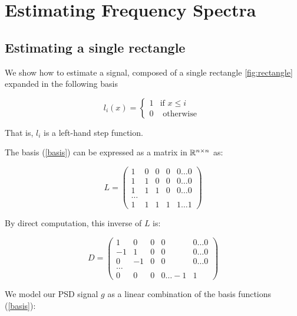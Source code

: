 \documentclass{article}
\begin{document}
\section{Estimating Frequency Spectra}\label{sec:freq-model}

\subsection{Estimating a single rectangle}

We show how to estimate a signal, composed of a single rectangle \eqref{fig:rectangle} expanded in the following basis

\begin{equation}
l_i\left(x\right) =
\begin{cases}
1 & \text{if } x \leq i \\
0 & \text{ otherwise } 
\end{cases}
\label{basis}
\end{equation}

That is, \(l_i\) is a left-hand step function. 

The basis (\ref{basis}) can be expressed as a matrix in \({\mathbb{R}}^{n \times n}\) as:

\begin{equation}
L = \begin{pmatrix}
 1 & 0 & 0 & 0  & 0 \ldots 0 \\
  1 & 1 & 0 & 0  & 0 \ldots 0\\
     1 & 1 & 1 & 0  & 0 \ldots0  \\
    \ldots  \\
     1 & 1 & 1 & 1  & 1 \ldots 1 
\end{pmatrix}
\label{lower-L}
\end{equation}

By direct computation, this inverse of \(L\) is:

\begin{equation}
D = \begin{pmatrix}
 1 & 0 & 0 & 0  & 0 \ldots 0 \\
  -1 & 1 & 0 & 0  & 0 \ldots 0\\
     0 & -1 & 0 & 0  & 0 \ldots0  \\
    \ldots  \\
     0 & 0 & 0 & 0  \ldots -1 & 1
\end{pmatrix}
\label{inv-L}
\end{equation}

We model our PSD signal \(g\) as a linear combination of the basis functions (\ref{basis}):
\end{document}
